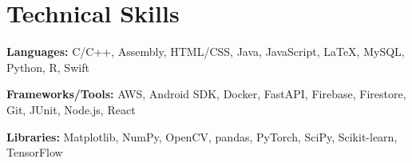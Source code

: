 \documentclass[letterpaper,11pt]{article}
\begin{document}
\section{Technical Skills}
\begin{itemize}[leftmargin=0.15in, label={}]
\small{
  \item{
    \textbf{Languages:} C/C++, Assembly, HTML/CSS, Java, JavaScript, LaTeX, MySQL, Python, R, Swift
  }
  \item{
    \textbf{Frameworks/Tools:} AWS, Android SDK, Docker, FastAPI, Firebase, Firestore, Git, JUnit, Node.js, React
  }
  \item{
    \textbf{Libraries:} Matplotlib, NumPy, OpenCV, pandas, PyTorch, SciPy, Scikit-learn, TensorFlow
  }
}
\end{itemize}
\end{document}
